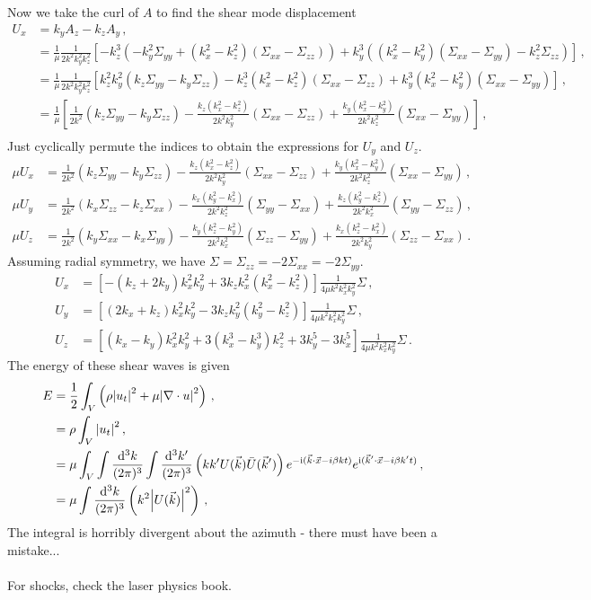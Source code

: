 \documentclass{article}
\newcommand*\diff{\mathop{}\!\mathrm{d}}
\newcommand*\te[1]{\text{#1}}
\newcommand*\p[1]{\left(#1\right)}
\newcommand*\ps[1]{\left[#1\right]}
\newcommand*\f[2]{\frac{#1}{#2}}
\newcommand*\I{\te{i}}
\begin{document}
Now we take the curl of $A$ to find the shear mode displacement
\begin{align}
U_x&=k_y A_z-k_z A_y\,,\\
&=\f1\mu\f{1}{2k^2k_y^2k_z^2}\ps{-k_z^3\p{-k_y^2\Sigma_{yy}+(k_x^2-k_z^2)(\Sigma_{xx}-\Sigma_{zz})}+k_y^3\p{(k_x^2-k_y^2)(\Sigma_{xx}-\Sigma_{yy})-k_z^2\Sigma_{zz}}}\,,\\
&=\f1\mu\f{1}{2k^2k_y^2k_z^2}\ps{k_z^2k_y^2(k_z\Sigma_{yy}-k_y\Sigma_{zz})-k_z^3(k_x^2-k_z^2)(\Sigma_{xx}-\Sigma_{zz})+k_y^3(k_x^2-k_y^2)(\Sigma_{xx}-\Sigma_{yy})}\,,\\
&=\f1\mu\ps{\f{1}{2k^2}(k_z\Sigma_{yy}-k_y\Sigma_{zz})-\f{k_z(k_x^2-k_z^2)}{2k^2k_y^2}(\Sigma_{xx}-\Sigma_{zz})+\f{k_y(k_x^2-k_y^2)}{2k^2k_z^2}(\Sigma_{xx}-\Sigma_{yy})}\,,\\
\end{align}
Just cyclically permute the indices to obtain the expressions for $U_y$ and $U_z$.
\begin{align}
\mu U_x&=\f{1}{2k^2}(k_z\Sigma_{yy}-k_y\Sigma_{zz})-\f{k_z(k_x^2-k_z^2)}{2k^2k_y^2}(\Sigma_{xx}-\Sigma_{zz})+\f{k_y(k_x^2-k_y^2)}{2k^2k_z^2}(\Sigma_{xx}-\Sigma_{yy})\,,\\
\mu U_y&=\f{1}{2k^2}(k_x\Sigma_{zz}-k_z\Sigma_{xx})-\f{k_x(k_y^2-k_x^2)}{2k^2k_z^2}(\Sigma_{yy}-\Sigma_{xx})+\f{k_z(k_y^2-k_z^2)}{2k^2k_x^2}(\Sigma_{yy}-\Sigma_{zz})\,,\\
\mu U_z&=\f{1}{2k^2}(k_y\Sigma_{xx}-k_x\Sigma_{yy})-\f{k_y(k_z^2-k_y^2)}{2k^2k_x^2}(\Sigma_{zz}-\Sigma_{yy})+\f{k_x(k_z^2-k_x^2)}{2k^2k_y^2}(\Sigma_{zz}-\Sigma_{xx})\,.
\end{align}
Assuming radial symmetry, we have $\Sigma=\Sigma_{zz}=-2\Sigma_{xx}=-2\Sigma_{yy}$.
\begin{align}
U_x&=\ps{-(k_z+2k_y)k_x^2k_y^2+3k_zk_x^2(k_x^2-k_z^2)}\f{1}{4\mu k^2k_x^2k_y^2}\Sigma\,,\\
U_y&=\ps{(2k_x+k_z)k_x^2k_y^2-3k_zk_y^2(k_y^2-k_z^2)}\f{1}{4\mu k^2k_x^2k_y^2}\Sigma\,,\\
U_z&=\ps{(k_x-k_y)k_x^2k_y^2+3(k_x^3-k_y^3)k_z^2+3k_y^5-3k_x^5}\f{1}{4\mu k^2k_x^2k_y^2}\Sigma\,.
\end{align}
The energy of these shear waves is given
\begin{align}
E&=\f12\int_V\p{\rho\abs{u_t}^2+\mu\abs{\nabla\cdot u}^2}\,,\\
&=\rho\int_V\abs{u_t}^2\,,\\
&=\mu\int_V\int\f{\diff^3 k}{(2\pi)^3}\int\f{\diff^3 k'}{(2\pi)^3}\p{k k'U(\vec k)\bar U(\vec k')}e^{-\I(\vec k\cdot\vec x-i\beta k t)}e^{\I(\vec k'\cdot\vec x-i\beta k' t)}\,,\\
&=\mu\int\f{\diff^3 k}{(2\pi)^3}\p{k^2\abs{U(\vec k)}^2}\,,\\
\end{align}
The integral is horribly divergent about the azimuth - there must have been a mistake...
\\\\
For shocks, check the laser physics book.
\end{document}
